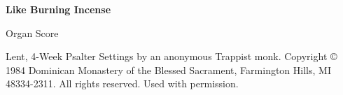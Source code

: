 \documentclass{lbi_organ_bind}
\begin{document}
\thispagestyle{empty}

\begin{center}
    \null\vfill
    \huge\bfseries
    Like Burning Incense

    \normalfont\huge
    \vspace{2\baselineskip}Organ Score

    \vspace{1\baselineskip}Lent, 4-Week Psalter
    \vfill\vfill\vfill
    \small
    Settings by an anonymous Trappist monk. Copyright © 1984 Dominican Monastery of the Blessed Sacrament, Farmington Hills, MI 48334-2311. All rights reserved. Used with permission.
\end{center}




\newpage\null\newpage

\end{document}
